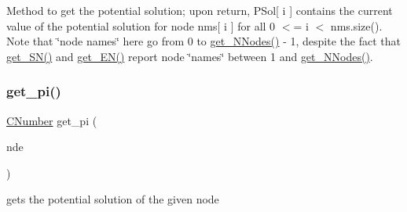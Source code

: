 Method to get the potential solution; upon return, P\+Sol\mbox{[} i \mbox{]} contains the current value of the potential solution for node nms\mbox{[} i \mbox{]} for all 0 $<$= i $<$ nms.\+size(). Note that \char`\"{}node names\char`\"{} here go from 0 to \mbox{\hyperlink{class_s_m_spp__di__unipi__it_1_1_m_c_f_block_afff9080606a5612d33ba20c39d663839}{get\+\_\+\+N\+Nodes()}} -\/ 1, despite the fact that \mbox{\hyperlink{class_s_m_spp__di__unipi__it_1_1_m_c_f_block_a48ce277b5dac05d54aa2281fa4595c7b}{get\+\_\+\+S\+N()}} and \mbox{\hyperlink{class_s_m_spp__di__unipi__it_1_1_m_c_f_block_a34619412f7c801aadfa0b083a6efda36}{get\+\_\+\+E\+N()}} report node \char`\"{}names\char`\"{} between 1 and \mbox{\hyperlink{class_s_m_spp__di__unipi__it_1_1_m_c_f_block_afff9080606a5612d33ba20c39d663839}{get\+\_\+\+N\+Nodes()}}. \mbox{\label{class_s_m_spp__di__unipi__it_1_1_m_c_f_block_aa4b481f2c50097b2f9c5aa5ab3c0c358}} 
\subsubsection{\texorpdfstring{get\+\_\+pi()}{get\_pi()}\hspace{0.1cm}{\footnotesize\ttfamily [3/3]}}
{\footnotesize\ttfamily \mbox{\hyperlink{class_s_m_spp__di__unipi__it_1_1_m_c_f_block_a24d0627ba8213afe1ec4ebeb4508e8f1}{C\+Number}} get\+\_\+pi (\begin{DoxyParamCaption}\item[{\mbox{\hyperlink{class_s_m_spp__di__unipi__it_1_1_m_c_f_block_aee6156e2ce80720d57a082d80f39d8cc}{c\+\_\+\+Index}}}]{nde }\end{DoxyParamCaption})\hspace{0.3cm}{\ttfamily [inline]}}



gets the potential solution of the given node 

